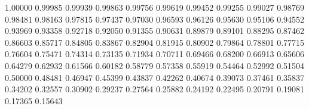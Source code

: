 \def\pgfmath@def#1#2#3{\expandafter\def\csname pgfmath@#1@#2\endcsname{#3}}
\pgfmath@def{cos}{0}{1.00000}		\pgfmath@def{cos}{1}{0.99985}
\pgfmath@def{cos}{2}{0.99939}		\pgfmath@def{cos}{3}{0.99863}
\pgfmath@def{cos}{4}{0.99756}		\pgfmath@def{cos}{5}{0.99619}
\pgfmath@def{cos}{6}{0.99452}		\pgfmath@def{cos}{7}{0.99255}
\pgfmath@def{cos}{8}{0.99027}		\pgfmath@def{cos}{9}{0.98769}
\pgfmath@def{cos}{10}{0.98481}		\pgfmath@def{cos}{11}{0.98163}
\pgfmath@def{cos}{12}{0.97815}		\pgfmath@def{cos}{13}{0.97437}
\pgfmath@def{cos}{14}{0.97030}		\pgfmath@def{cos}{15}{0.96593}
\pgfmath@def{cos}{16}{0.96126}		\pgfmath@def{cos}{17}{0.95630}
\pgfmath@def{cos}{18}{0.95106}		\pgfmath@def{cos}{19}{0.94552}
\pgfmath@def{cos}{20}{0.93969}		\pgfmath@def{cos}{21}{0.93358}
\pgfmath@def{cos}{22}{0.92718}		\pgfmath@def{cos}{23}{0.92050}
\pgfmath@def{cos}{24}{0.91355}		\pgfmath@def{cos}{25}{0.90631}
\pgfmath@def{cos}{26}{0.89879}		\pgfmath@def{cos}{27}{0.89101}
\pgfmath@def{cos}{28}{0.88295}		\pgfmath@def{cos}{29}{0.87462}
\pgfmath@def{cos}{30}{0.86603}		\pgfmath@def{cos}{31}{0.85717}
\pgfmath@def{cos}{32}{0.84805}		\pgfmath@def{cos}{33}{0.83867}
\pgfmath@def{cos}{34}{0.82904}		\pgfmath@def{cos}{35}{0.81915}
\pgfmath@def{cos}{36}{0.80902}		\pgfmath@def{cos}{37}{0.79864}
\pgfmath@def{cos}{38}{0.78801}		\pgfmath@def{cos}{39}{0.77715}
\pgfmath@def{cos}{40}{0.76604}		\pgfmath@def{cos}{41}{0.75471}
\pgfmath@def{cos}{42}{0.74314}		\pgfmath@def{cos}{43}{0.73135}
\pgfmath@def{cos}{44}{0.71934}		\pgfmath@def{cos}{45}{0.70711}
\pgfmath@def{cos}{46}{0.69466}		\pgfmath@def{cos}{47}{0.68200}
\pgfmath@def{cos}{48}{0.66913}		\pgfmath@def{cos}{49}{0.65606}
\pgfmath@def{cos}{50}{0.64279}		\pgfmath@def{cos}{51}{0.62932}
\pgfmath@def{cos}{52}{0.61566}		\pgfmath@def{cos}{53}{0.60182}
\pgfmath@def{cos}{54}{0.58779}		\pgfmath@def{cos}{55}{0.57358}
\pgfmath@def{cos}{56}{0.55919}		\pgfmath@def{cos}{57}{0.54464}
\pgfmath@def{cos}{58}{0.52992}		\pgfmath@def{cos}{59}{0.51504}
\pgfmath@def{cos}{60}{0.50000}		\pgfmath@def{cos}{61}{0.48481}
\pgfmath@def{cos}{62}{0.46947}		\pgfmath@def{cos}{63}{0.45399}
\pgfmath@def{cos}{64}{0.43837}		\pgfmath@def{cos}{65}{0.42262}
\pgfmath@def{cos}{66}{0.40674}		\pgfmath@def{cos}{67}{0.39073}
\pgfmath@def{cos}{68}{0.37461}		\pgfmath@def{cos}{69}{0.35837}
\pgfmath@def{cos}{70}{0.34202}		\pgfmath@def{cos}{71}{0.32557}
\pgfmath@def{cos}{72}{0.30902}		\pgfmath@def{cos}{73}{0.29237}
\pgfmath@def{cos}{74}{0.27564}		\pgfmath@def{cos}{75}{0.25882}
\pgfmath@def{cos}{76}{0.24192}		\pgfmath@def{cos}{77}{0.22495}
\pgfmath@def{cos}{78}{0.20791}		\pgfmath@def{cos}{79}{0.19081}
\pgfmath@def{cos}{80}{0.17365}		\pgfmath@def{cos}{81}{0.15643}
